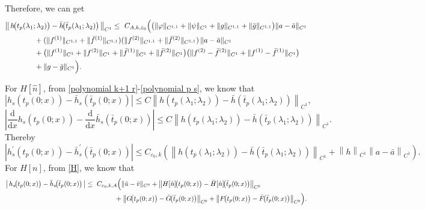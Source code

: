 \documentclass[a4paper,reqno,11pt]{amsart}
\numberwithin{equation}{section} %
\begin{document}
Therefore, we can get
\[
\begin{aligned}
&\bigl\|\,h\!\bigl(t_p(\lambda_1;\lambda_2)\bigr)
 - \bar h\!\bigl(\bar t_p(\lambda_1;\lambda_2)\bigr)\,\bigr\|_{C^{1}}
\le{}\ C_{A,k,\varepsilon_0}\Bigl(
   \bigl(\|\varphi\|_{C^{1,1}}+\|\psi\|_{C^{1}}
     + \|g\|_{C^{1,1}}+\|\bar g\|_{C^{1,1}}\bigr) \|a-\bar a\|_{C^{1}}
\\
&\qquad \qquad
     + (\|f^{(1)}\|_{C^{1,1}}+\|\bar f^{(1)}\|_{C^{1,1}})
       (\|f^{(2)}\|_{C^{1,1}}+\|\bar f^{(2)}\|_{C^{1,1}})\,
    \|a-\bar a\|_{C^{1}}
\\
&\qquad \qquad
  + \bigl(\|f^{(1)}\|_{C^{1}}+\|f^{(2)}\|_{C^{1}}
       +\|\bar f^{(1)}\|_{C^{1}}+\|\bar f^{(2)}\|_{C^{1}}\bigr)
  \bigl(\|f^{(2)}-\bar f^{(2)}\|_{C^{1}}
       +\|f^{(1)}-\bar f^{(1)}\|_{C^{1}}\bigr)
\\
&\qquad \qquad
  + \|g-\bar g\|_{C^{1}}
\Bigr).
\end{aligned}
\]

For $H[\hat{n}]$, from \eqref{polynomial k+1 r}-\eqref{polynomial p s}, we know that
$$
\left| h_s\left( t_p(0;x) \right) -\bar{h}_s\left( \bar{t}_p(0;x) \right) \right|\le C\left\| h\left( t_p\left( \lambda _1;\lambda _2 \right) \right) -\bar{h}\left( \bar{t}_p\left( \lambda _1;\lambda _2 \right) \right) \right\| _{C^1},
$$
$$
\left| \frac{\mathrm{d}}{\mathrm{d}x} h_s\left( t_p(0;x) \right) -\frac{\mathrm{d}}{\mathrm{d}x}\bar{h}_s\left( \bar{t}_p(0;x) \right) \right|\le C\left\| h\left( t_p\left( \lambda _1;\lambda _2 \right) \right) -\bar{h}\left( \bar{t}_p\left( \lambda _1;\lambda _2 \right) \right) \right\| _{C^1}.
$$
Thereby
$$
\left| h_{s}^{\prime}\left( t_p(0;x) \right) -\bar{h}_{s}^{\prime}\left( \bar{t}_p(0;x) \right) \right|\le C_{\varepsilon _0,k}\left( \left\| h\left( t_p\left( \lambda _1;\lambda _2 \right) \right) -\bar{h}\left( \bar{t}_p\left( \lambda _1;\lambda _2 \right) \right) \right\| _{C^1}+\left\| h \right\| _{C^1}\left\| a-\bar{a} \right\| _{C^1} \right) .
$$
For $H[n]$, from \eqref{H}, we know that 
\[
\begin{aligned}
\bigl|\,h_s\!\bigl(t_p(0;x)\bigr)-\bar h_s\!\bigl(\bar t_p(0;x)\bigr)\,\bigr|
\le{}&\ C_{\varepsilon_0,k,A}\Bigl(
  \|\tilde u-\tilde v\|_{C^{0}}
  + \bigl\| H[\hat n]\!\bigl(t_p(0;x)\bigr)-\bar H[\hat n]\!\bigl(\bar t_p(0;x)\bigr)\bigr\|_{C^{0}} \\
&\qquad\quad
  + \bigl\| G\!\bigl(t_p(0;x)\bigr)-\bar G\!\bigl(\bar t_p(0;x)\bigr)\bigr\|_{C^{0}}
  + \bigl\| F\!\bigl(t_p(0;x)\bigr)-\bar F\!\bigl(\bar t_p(0;x)\bigr)\bigr\|_{C^{0}}
\Bigr).
\end{aligned}
\]
\end{document}
